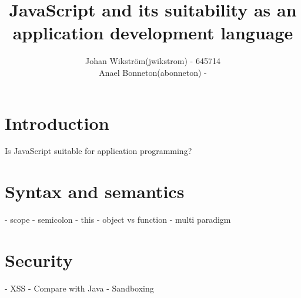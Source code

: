 \documentclass{report}
\title{JavaScript and its suitability as an application development language}
\author{Johan Wikström(jwikstrom) - 645714\\
Anael Bonneton(abonneton) - 
}
\begin{document}
\maketitle
\tableofcontents
\section{Introduction}
Is JavaScript suitable for application programming?
\section{Syntax and semantics}
	- scope
	- semicolon
	- this
	- object vs function
	- multi paradigm
\section{Security}
	- XSS
	- Compare with Java
	- Sandboxing
	
\end{document}
